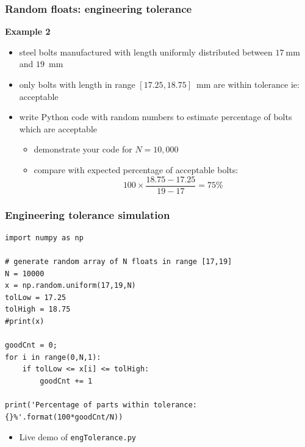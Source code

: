 \documentclass[english,14pt]{beamer}
\begin{document}

\begin{frame}[fragile]

\frametitle{Random floats: engineering tolerance}

\textbf{Example 2}\\
\vspace*{2mm}
\begin{itemize}
	\item steel bolts manufactured with length uniformly distributed between $17~$mm and $19$~mm
	\item only bolts with length in range $[17.25,18.75]$~mm are within tolerance ie: acceptable
	\item write Python code with random numbers to estimate percentage of bolts which are acceptable
	\begin{itemize}
		\item demonstrate your code for $N=10,000$
		\item compare with expected percentage of acceptable bolts:
		\[
			100 \times \frac{18.75-17.25}{19-17} = 75\%
		\]
	\end{itemize}
\end{itemize}

\end{frame}


\begin{frame}[fragile]

\frametitle{Engineering tolerance simulation}
\vspace*{-3mm}
\begin{lstlisting}[style=CStyle]
import numpy as np

# generate random array of N floats in range [17,19]
N = 10000
x = np.random.uniform(17,19,N)
tolLow = 17.25
tolHigh = 18.75
#print(x)

goodCnt = 0;
for i in range(0,N,1):
    if tolLow <= x[i] <= tolHigh:
        goodCnt += 1

print('Percentage of parts within tolerance: {}%'.format(100*goodCnt/N))
\end{lstlisting}
\vspace*{-3mm}
\begin{itemize}
	\item Live demo of \texttt{engTolerance.py}
\end{itemize}
\end{frame}
\end{document}
